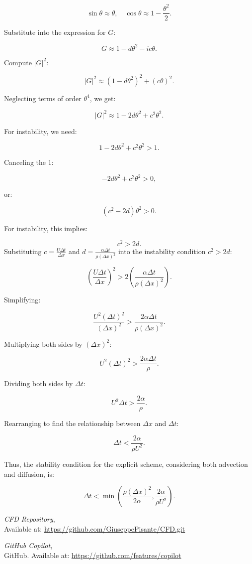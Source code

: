 \documentclass{article}
\begin{document}
\begin{enumerate}
  \[
  \sin \theta \approx \theta, \quad \cos \theta \approx 1 - \frac{\theta^2}{2}.
  \]

  Substitute into the expression for \( G \):

  \[
  G \approx 1 - d \theta^2 - i c \theta.
  \]

  Compute \( |G|^2 \):

  \[
  |G|^2 \approx (1 - d \theta^2)^2 + (c \theta)^2.
  \]

  Neglecting terms of order \( \theta^4 \), we get:

  \[
  |G|^2 \approx 1 - 2d \theta^2 + c^2 \theta^2.
  \]

  For instability, we need:

  \[
  1 - 2d \theta^2 + c^2 \theta^2 > 1.
  \]

  Canceling the 1:

  \[
  -2d \theta^2 + c^2 \theta^2 > 0,
  \]

  or:

  \[
  (c^2 - 2d) \theta^2 > 0.
  \]

  For instability, this implies:

  \[
  c^2 > 2d.
  \]
  Substituting \( c = \frac{U \Delta t}{\Delta x} \) and \( d = \frac{\alpha \Delta t}{\rho (\Delta x)^2} \) into the instability condition \( c^2 > 2d \):

  \[
  \left( \frac{U \Delta t}{\Delta x} \right)^2 > 2 \left( \frac{\alpha \Delta t}{\rho (\Delta x)^2} \right).
  \]

  Simplifying:

  \[
  \frac{U^2 (\Delta t)^2}{(\Delta x)^2} > \frac{2 \alpha \Delta t}{\rho (\Delta x)^2}.
  \]

  Multiplying both sides by \( (\Delta x)^2 \):

  \[
  U^2 (\Delta t)^2 > \frac{2 \alpha \Delta t}{\rho}.
  \]

  Dividing both sides by \( \Delta t \):

  \[
  U^2 \Delta t > \frac{2 \alpha}{\rho}.
  \]

  Rearranging to find the relationship between \( \Delta x \) and \( \Delta t \):

  \[
  \Delta t < \frac{2 \alpha}{\rho U^2}.
  \]

  Thus, the stability condition for the explicit scheme, considering both advection and diffusion, is:

  \[
  \Delta t < \min \left( \frac{\rho (\Delta x)^2}{2 \alpha}, \frac{2 \alpha}{\rho U^2} \right).
  \]
\end{enumerate}

\begin{thebibliography}{9}
  \textit{CFD Repository},\\
  Available at: \url{https://github.com/GiuseppePisante/CFD.git}
  
  \textit{GitHub Copilot},\\
  GitHub. Available at: \url{https://github.com/features/copilot}

\end{thebibliography}
\end{document}
